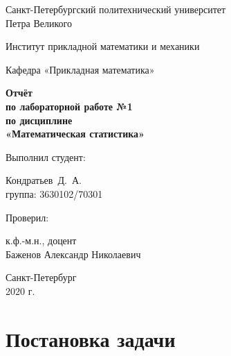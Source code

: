 \documentclass[12pt,a4paper]{article}
\begin{document}
	\begin{titlepage}
		\begin{center}			
			Санкт-Петербургский политехнический университет\\
			Петра Великого
			\vspace{0.25cm}
			
			Институт прикладной математики и механики
			
			Кафедра «Прикладная математика»
			\vfill
			
			\textbf{Отчёт\\
				по лабораторной работе №1\\
				по дисциплине\\
				«Математическая статистика»}\\[5mm]
			\bigskip
		\end{center}
		\vfill
		
		\hfill\begin{minipage}{0.45\textwidth}
			Выполнил студент:
			\vspace{0.2cm}
			
			Кондратьев~Д.~А.\\
			группа: 3630102/70301
		\end{minipage}%
		\bigskip
		
		\hfill\begin{minipage}{0.45\textwidth}
			Проверил:
			\vspace{0.2cm}
			
			к.ф.-м.н., доцент\\
			Баженов Александр Николаевич
		\end{minipage}%
		\vfill
		
		\begin{center}
			Санкт-Петербург\\
			2020 г.
		\end{center}
	\end{titlepage}
	
	
	
	\tableofcontents{}
	\newpage
	
	\section{Постановка задачи}
	
\end{document}
